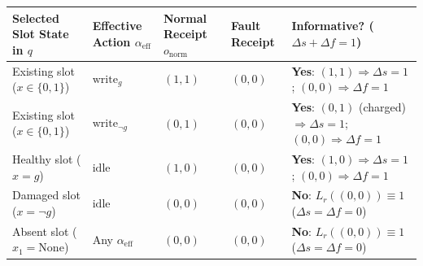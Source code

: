 \documentclass[11pt,letterpaper]{article}
\newcounter{none}
\begin{document}

{\def\LTcaptype{none} %
\begin{longtable}[]{@{}
  >{\raggedright\arraybackslash}p{}
  >{\raggedright\arraybackslash}p{}
  >{\centering\arraybackslash}p{}
  >{\centering\arraybackslash}p{}
  >{\raggedright\arraybackslash}p{}@{}}
\toprule\noalign{}
\begin{minipage}[b]{\linewidth}\raggedright
Selected Slot State in \(q\)
\end{minipage} & \begin{minipage}[b]{\linewidth}\raggedright
Effective Action \(\alpha_{\mathrm{eff}}\)
\end{minipage} & \begin{minipage}[b]{\linewidth}\centering
Normal Receipt \(o_{\mathrm{norm}}\)
\end{minipage} & \begin{minipage}[b]{\linewidth}\centering
Fault Receipt
\end{minipage} & \begin{minipage}[b]{\linewidth}\raggedright
Informative? (\(\Delta s + \Delta f = 1\))
\end{minipage} \\
\midrule\noalign{}
\endhead
\bottomrule\noalign{}
\endlastfoot
Existing slot (\(x \in \{0,1\}\)) & \(\mathrm{write}_g\) & \((1, 1)\) &
\((0, 0)\) & \textbf{Yes}: \((1,1) \Rightarrow \Delta s=1\);
\((0,0) \Rightarrow \Delta f=1\) \\
Existing slot (\(x \in \{0,1\}\)) & \(\mathrm{write}_{\neg g}\) &
\((0, 1)\) & \((0, 0)\) & \textbf{Yes}: \((0,1)\) (charged)
\(\Rightarrow \Delta s=1\); \((0,0) \Rightarrow \Delta f=1\) \\
Healthy slot (\(x = g\)) & \(\mathrm{idle}\) & \((1, 0)\) & \((0, 0)\) &
\textbf{Yes}: \((1,0) \Rightarrow \Delta s=1\);
\((0,0) \Rightarrow \Delta f=1\) \\
Damaged slot (\(x = \neg g\)) & \(\mathrm{idle}\) & \((0, 0)\) &
\((0, 0)\) & \textbf{No}: \(L_r((0,0)) \equiv 1\)
(\(\Delta s = \Delta f = 0\)) \\
Absent slot (\(x_1 = \mathrm{None}\)) & Any \(\alpha_{\mathrm{eff}}\) &
\((0, 0)\) & \((0, 0)\) & \textbf{No}: \(L_r((0,0)) \equiv 1\)
(\(\Delta s = \Delta f = 0\)) \\
\end{longtable}
}
\end{document}

